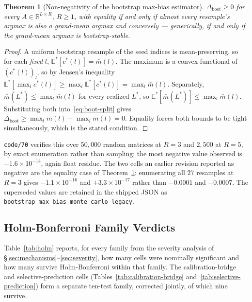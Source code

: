 \documentclass{article}
\newtheorem{theorem}{Theorem}
\begin{document}
\begin{theorem}[Non-negativity of the bootstrap max-bias estimator]
\label{thm:boot-nonneg}
$\Delta_{\text{boot}}\ge0$ for every $A\in\mathbb{R}^{L\times R}$, $R\ge1$,
with equality if and only if almost every resample's argmax is also a
grand-mean argmax and conversely --- generically, if and only if the
grand-mean argmax is bootstrap-stable.
\end{theorem}

\begin{proof}
A uniform bootstrap resample of the seed indices is mean-preserving, so for
each \emph{fixed} $l$, $\mathbb{E}^{*}[c^{*}(l)]=\bar m(l)$. The maximum is a
convex functional of $(c^{*}(l))_l$, so by Jensen's inequality
$\mathbb{E}^{*}\!\left[\max_l c^{*}(l)\right]\ge\max_l \mathbb{E}^{*}[c^{*}(l)]
=\max_l \bar m(l)$. Separately, $\bar m(L^{*})\le\max_l \bar m(l)$ for every
realized $L^{*}$, so $\mathbb{E}^{*}[\bar m(L^{*})]\le\max_l \bar m(l)$.
Substituting both into~\eqref{eq:boot-split} gives
$\Delta_{\text{boot}}\ge\max_l\bar m(l)-\max_l\bar m(l)=0$. Equality forces
both bounds to be tight simultaneously, which is the stated condition.
\end{proof}

\texttt{code/70} verifies this over $50{,}000$ random matrices at $R=3$ and
$2{,}500$ at $R=5$, by exact enumeration rather than sampling; the most
negative value observed is $-1.6\times10^{-14}$, again float residue. The two
cells an earlier revision reported as negative are the equality case of
Theorem~\ref{thm:boot-nonneg}: enumerating all $27$ resamples at $R=3$ gives
$-1.1\times10^{-16}$ and $+3.3\times10^{-17}$ rather than $-0.0001$ and
$-0.0007$. The superseded values are retained in the shipped JSON as
\texttt{bootstrap\_max\_bias\_monte\_carlo\_legacy}.

\subsection{Holm-Bonferroni Family Verdicts}
\label{app:holm}

Table~\ref{tab:holm} reports, for every family from the severity analysis of
\S\ref{sec:mechanisms}--\ref{sec:severity}, how many cells were nominally
significant and how many survive Holm-Bonferroni within that family. The
calibration-bridge and selective-prediction cells
(Tables~\ref{tab:calibration-bridge} and~\ref{tab:selective-prediction}) form
a separate ten-test family, corrected jointly, of which nine survive.
\end{document}
